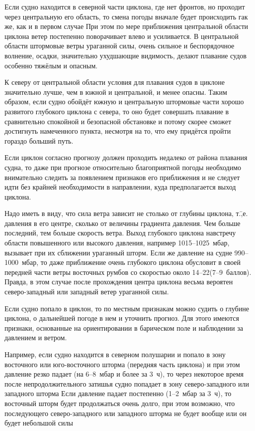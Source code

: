 Если судно находится в северной части циклона, где нет фронтов, но
проходит через центральную его область, то смена погоды вначале будет
происходить гак же, как и в первом случае При этом по мере приближения
центральной области циклона ветер постепенно поворачивает влево и
усиливается. В центральной области штормовые ветры ураганной силы,
очень сильное и беспорядочное волнение, осадки, значительно ухудшающие
видимость, делают плавание судов особенно тяжёлым и опасным.

К северу от центральной области условия для плавания судов в циклоне
значительно лучше, чем в южной и центральной, и менее опасны. Таким
образом, если судно обойдёт южную и центральную штормовые части хорошо
развитого глубокого циклона с севера, то оно будет совершать плавание
в сравнительно спокойной и безопасной обстановке и потому скорее
сможет достигнуть намеченного пункта, несмотря на то, что ему придётся
пройти гораздо больший путь.

Если циклон согласно прогнозу должен проходить недалеко от района
плавания судна, то даже при прогнозе относительно благоприятной погоды
необходимо внимательно следить за появлением признаков его приближения
и не следует идти без крайней необходимости в направлении, куда
предполагается выход циклона.

Надо иметь в виду, что сила ветра зависит не столько от глубины
циклона, т.\=,е. давления в его центре, сколько от величины градиента
давления. Чем больше последний, тем больше скорость ветра. Выход
глубокого циклона навстречу области повышенного или высокого давления,
например 1015--1025~мбар, вызывает при их сближении ураганный
шторм. Если же давление на судне 990--1000~мбар, то даже приближение
очень глубокого циклона обусловит в своей передней части ветры
восточных румбов со скоростью около 14--22\speedms (7--9~баллов). Правда,
в этом случае после прохождения центра циклона весьма вероятен
северо-западный или западный ветер ураганной силы.

Если судно попало в циклон, то по местным признакам можно судить о
глубине циклона, о дальнейшей погоде в нем и уточнить прогноз. Для
этого имеются признаки, основанные на ориентировании в барическом поле
и наблюдении за давлением и ветром.

Например, если судно находится в северном полушарии и попало в зону
восточного или юго-восточного шторма (передняя часть циклона) и при
этом давление резко падает (на 6--8~мбар и более за 3~ч), то через
некоторое время после непродолжительного затишья судно попадает в зону
северо-западного или западного шторма Если давление падает постепенно
(1--2~мбар за 3~ч), то восточный шторм будет продолжаться очень долго,
при этом возможно, что последующего северо-западного или западного
шторма не будет вообще или он будет небольшой силы

